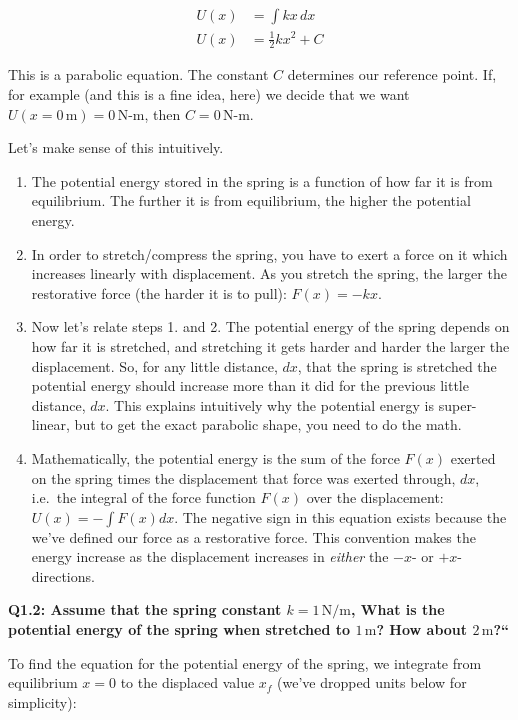 \documentclass{book}
\providecommand{\tightlist}{%
  \setlength{\itemsep}{0pt}\setlength{\parskip}{0pt}}
\begin{document}
\begin{align*}   U(x) &= \int kx\,dx\\    U(x) &= \frac{1}{2}kx^2 + C \end{align*}

This is a parabolic equation. The constant \(C\) determines our reference
point. If, for example (and this is a fine idea, here) we decide that we want
\(U(x=0 \,\text{m}) = 0 \,\text{N-m}\), then \(C = 0 \,\text{N-m}\).

Let's make sense of this intuitively.

\begin{enumerate}
\def\labelenumi{\arabic{enumi}.}
\tightlist
\item
  The potential energy stored in the spring is a function of how far it is
  from equilibrium. The further it is from equilibrium, the higher the
  potential energy.
\item
  In order to stretch/compress the spring, you have to exert a force on it
  which increases linearly with displacement. As you stretch the spring, the
  larger the restorative force (the harder it is to pull): \(F(x)=-kx\).
\item
  Now let's relate steps 1. and 2. The potential energy of the spring depends
  on how far it is stretched, and stretching it gets harder and harder the
  larger the displacement. So, for any little distance, \(dx\), that the
  spring is stretched the potential energy should increase more than it did
  for the previous little distance, \(dx\). This explains intuitively why the
  potential energy is super-linear, but to get the exact parabolic shape, you
  need to do the math.
\item
  Mathematically, the potential energy is the sum of the force \(F(x)\)
  exerted on the spring times the displacement that force was exerted through,
  \(dx\), i.e.~the integral of the force function \(F(x)\) over the
  displacement: \(U(x)= -\int F(x)dx\). The negative sign in this equation
  exists because the we've defined our force as a restorative force. This
  convention makes the energy increase as the displacement increases in
  \emph{either} the \(-x\)- or \(+x\)-directions.
\end{enumerate}

\textbf{Q1.2: Assume that the spring constant \(k = 1\,\mathrm{N/m}\), What is
the potential energy of the spring when stretched to \(1 \,\mathrm{m}\)? How
about \(2 \,\mathrm{m}\)?{}``}

To find the equation for the potential energy of the spring, we integrate from
equilibrium \(x=0\) to the displaced value \(x_f\) (we've dropped units below
for simplicity):
\end{document}
